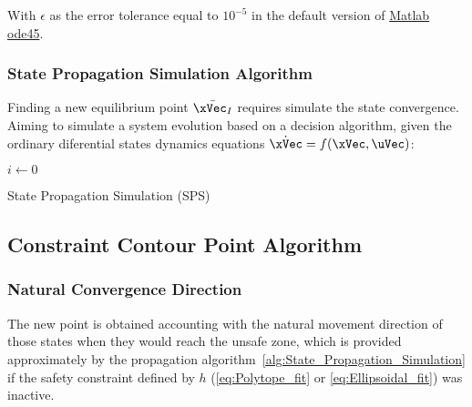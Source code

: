 With \(\epsilon\) as the error tolerance equal to \(10^{-5}\) in the default version of \href{https://www.mathworks.com/help/matlab/ref/ode45.html}{Matlab ode45}.

\subsubsection{State Propagation Simulation Algorithm}
\label{subsub:State_Propagation_Simulation_Algorithm}

Finding a new equilibrium point \(\bar{\xVec_I}\) requires simulate the state convergence. Aiming to simulate a system evolution based on a decision algorithm, given the ordinary diferential states dynamics equations \(\dot{\xVec} = f(\xVec,\uVec)\):

  \begin{algorithm}
    \KwResult{$\xVec$, $\uVec$}
    $i \gets 0$ \;
    \caption{State Propagation Simulation (SPS)} \label{alg:State_Propagation_Simulation}
  \end{algorithm}


\newpage %

\subsection{Constraint Contour Point Algorithm}
\label{subsec:Constraint_Contour_Point_Algorithm}

\subsubsection{Natural Convergence Direction}
\label{subsubsec:Intersection_Vector}

The new point is obtained accounting with the natural movement direction of those states when they would reach the unsafe zone, which is provided approximately by the propagation algorithm~\ref{alg:State_Propagation_Simulation} if the safety constraint defined by \(h\) (\ref{eq:Polytope_fit} or \ref{eq:Ellipsoidal_fit}) was inactive. 

